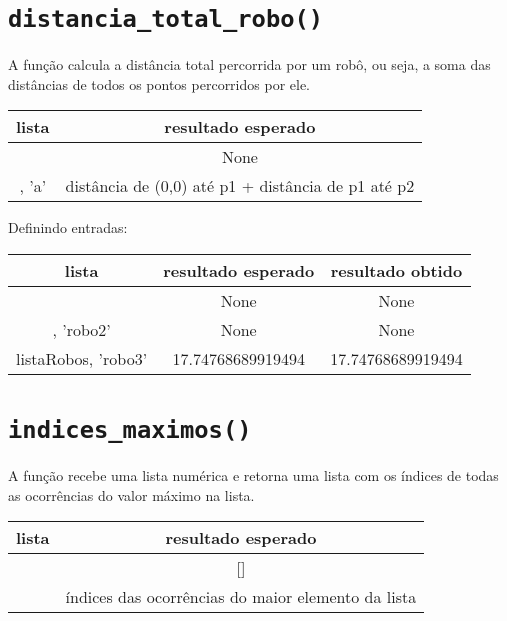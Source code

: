 \begin{apendicesenv}
\begin{center}
\begin{tabular}{|c|c|c|}
    \end{tabular}
\end{center}

\section{\texttt{distancia\_total\_robo()}}
A função calcula a distância total percorrida por um robô, ou seja, a soma das distâncias de todos os pontos percorridos por ele.

\begin{center}
    \begin{tabular}{|c|c|}
        \cline{1-2}
        lista & resultado esperado \\ \hline
        [] & None \\ \hline  
        [(a,(p1)),(a,(p2))], 'a' & distância de (0,0) até p1 + distância de p1 até p2 \\ \hline
    \end{tabular}
\end{center}


Definindo entradas:

\begin{center}
    \begin{tabular}{|c|c|c|}
        \cline{1-3}
        lista & resultado esperado & resultado obtido  \\ \hline
        [] & None & None \\ \hline
        [('robo1',2,(4,4),5)], 'robo2' & None & None \\ \hline
        listaRobos, 'robo3' & 17.74768689919494 & 17.74768689919494 \\ \hline

    \end{tabular}
\end{center} 


\section{\texttt{indices\_maximos()}}
A função recebe uma lista numérica e retorna uma lista com os índices de todas as ocorrências do valor máximo na lista.

\begin{center}
    \begin{tabular}{|c|c|}
        \cline{1-2}
        lista & resultado esperado \\ \hline
        [] & [] \\ \hline  
        [a, b, c, d] & índices das ocorrências do maior elemento da lista  \\ \hline
    \end{tabular}
\end{center}


\end{apendicesenv}
